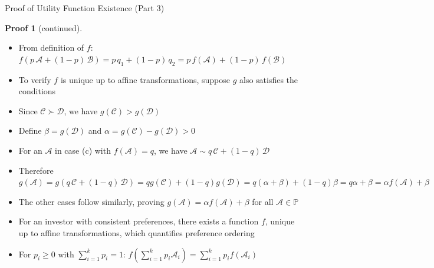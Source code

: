\documentclass[10pt,handout]{beamer}
\newcommand{\ds}{\displaystyle}
\theoremstyle{definition}
\newtheorem*{prf}{Proof}
\begin{document}
\begin{frame}{Proof of Utility Function Existence (Part 3)}
  \begin{prf}[continued]
    \begin{itemize}[<+->]
      \item From definition of $f$: $f(p\,\mathcal{A} + (1-p)\,\mathcal{B}) = p\,q_1 + (1-p)\,q_2 = p\,f(\mathcal{A}) + (1-p)\,f(\mathcal{B})$
      \item To verify $f$ is unique up to affine transformations, suppose $g$ also satisfies the conditions
      \item Since $\mathcal{C} \succ \mathcal{D}$, we have $g(\mathcal{C}) > g(\mathcal{D})$
      \item Define $\beta = g(\mathcal{D})$ and $\alpha = g(\mathcal{C})-g(\mathcal{D}) > 0$
      \item For an $\mathcal{A}$ in case (c) with $f(\mathcal{A}) = q$, we have $\mathcal{A} \sim q\,\mathcal{C} + (1-q)\,\mathcal{D}$
      \item Therefore $\ds g(\mathcal{A}) = g(q\,\mathcal{C} + (1-q)\,\mathcal{D}) = qg(\mathcal{C}) + (1-q)g(\mathcal{D}) = q(\alpha + \beta) + (1-q)\beta = q\alpha + \beta = \alpha f(\mathcal{A}) + \beta$
      \item The other cases follow similarly, proving $\ds g(\mathcal{A}) = \alpha f(\mathcal{A}) + \beta$ for all $\mathcal{A} \in \mathbb{P}$
    \end{itemize}
  \end{prf}
  
  \begin{itemize}[<+->]
    \item For an investor with consistent preferences, there exists a function $f$, unique up to affine transformations, which quantifies preference ordering
    \item For $p_i \geqslant 0$ with $\sum_{i=1}^k p_i = 1$: $f\left(\sum_{i=1}^k p_i \mathcal{A}_i\right) = \sum_{i=1}^k p_i f(\mathcal{A}_i)$
  \end{itemize}
\end{frame}
\end{document}
